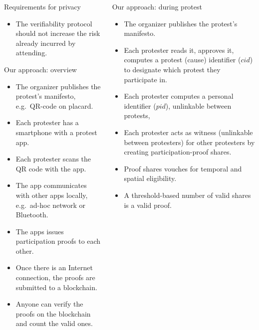\begin{columns}[t]
\begin{column}{0.32\linewidth}
    \begin{blueblock}{Requirements for privacy}
      \begin{itemize}
        \item The verifiability protocol should not increase the risk already 
          incurred by attending.
      \end{itemize}
    \end{blueblock}

    \begin{greenblock}{Our approach: overview}
      \begin{itemize}
        \item The organizer publishes the protest's manifesto, e.g.\ QR-code on 
          placard.
        \item Each protester has a smartphone with a protest app.
        \item Each protester scans the QR code with the app.
        \item The app communicates with other apps locally, e.g.\ ad-hoc network 
          or Bluetooth.
        \item The apps issues participation proofs to each other.
        \item Once there is an Internet connection, the proofs are submitted to 
          a blockchain.
        \item Anyone can verify the proofs on the blockchain and count the valid 
          ones.
      \end{itemize}
    \end{greenblock}

  \end{column}

  \hfill

  \begin{column}{0.32\linewidth}

    \begin{greenblock}{Our approach: during protest}
      \begin{itemize}
        \item The organizer publishes the protest's manifesto.
        \item Each protester reads it, approves it, computes a protest (cause) 
          identifier (\(cid\)) to designate which protest they participate in.
        \item Each protester computes a personal identifier (\(pid\)), 
          unlinkable between protests,
        \item Each protester acts as witness (unlinkable between protesters) for 
          other protesters by creating participation-proof shares.
        \item Proof shares vouches for temporal and spatial eligibility.
        \item A threshold-based number of valid shares is a valid proof.
      \end{itemize}
    \end{greenblock}


\end{column}
\end{columns}
